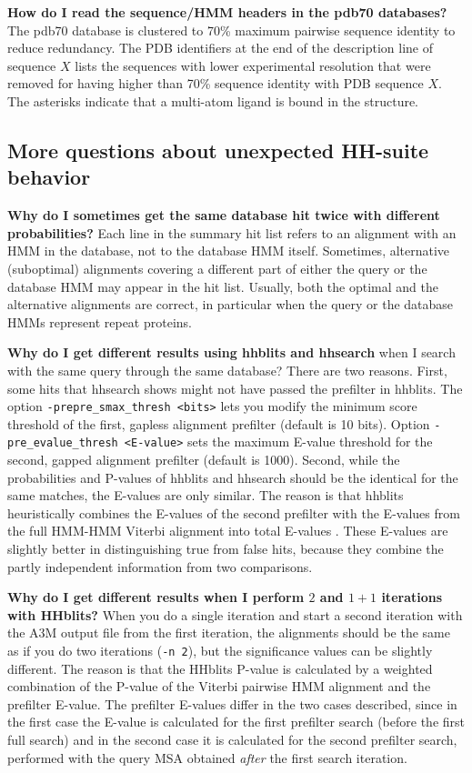 \documentclass[11pt,a4paper]{article}
\begin{document}
{\bf How do I read the sequence/HMM headers in the pdb70 databases?}
The pdb70 database is clustered to 70\% maximum pairwise sequence identity to reduce redundancy. The PDB identifiers at the end of the description line of sequence $X$ lists the sequences with lower experimental resolution that were removed for having higher than 70\% sequence identity with PDB sequence $X$. The asterisks indicate that a multi-atom ligand is bound in the structure. 


\subsection{More questions about unexpected HH-suite behavior}

{\bf Why do I sometimes get the same database hit twice with different probabilities?} Each line in the summary hit list refers to an alignment with an HMM in the database, not to the database HMM itself. Sometimes, alternative (suboptimal) alignments covering a different part of either the query or the database HMM may appear in the hit list. Usually, both the optimal and the alternative alignments are correct, in particular when the query or the database HMMs represent repeat proteins. 

{\bf Why do I get different results using hhblits and hhsearch} when I search with the same query through the same database? There are two reasons. First, some hits that hhsearch shows might not have passed the prefilter in hhblits. The option \verb`-prepre_smax_thresh <bits>` lets you modify the minimum score threshold of the first, gapless alignment prefilter (default is 10 bits). Option \verb`-pre_evalue_thresh <E-value>` sets the maximum E-value threshold for the second, gapped alignment prefilter (default is 1000). Second, while the probabilities and P-values of hhblits and hhsearch should be the identical for the same matches, the E-values are only similar. The reason is that hhblits heuristically combines the E-values of the second prefilter with the E-values from the full HMM-HMM Viterbi alignment into total E-values \cite{Remmert:2011}. These E-values are slightly better in distinguishing true from false hits, because they combine the partly independent information from two comparisons.

{\label{2_vs_1+1} \bf Why do I get different results when I perform $2$ and $1+1$ iterations with HHblits?} When you do a single iteration and start a second iteration with the A3M output file from the first iteration, the alignments should be the same as if you do two iterations (\verb`-n 2`), but the significance values can be slightly different. The reason is that the HHblits P-value is calculated by a weighted combination of the P-value of the Viterbi pairwise HMM alignment and the prefilter E-value. The prefilter E-values differ in the two cases described, since in the first case the E-value is calculated for the first prefilter search (before the first full search) and in the second case it is calculated for the second prefilter search, performed with the query MSA obtained \emph{after} the first search iteration. 
\end{document}
